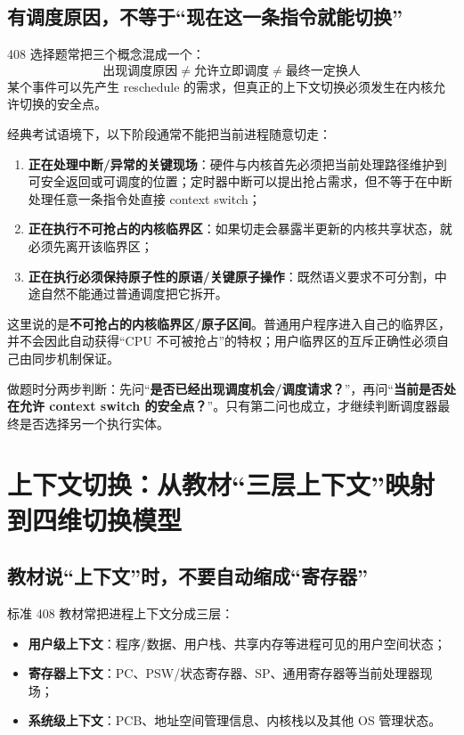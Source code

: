 \documentclass[11pt,a4paper]{ctexart}
\newcommand{\kw}[1]{\textbf{#1}}
\begin{document}
\subsection{有调度原因，不等于“现在这一条指令就能切换”}

408 选择题常把三个概念混成一个：
\[
\boxed{\text{出现调度原因}\neq\text{允许立即调度}\neq\text{最终一定换人}}
\]
某个事件可以先产生 reschedule 的需求，但真正的上下文切换必须发生在内核允许切换的安全点。

经典考试语境下，以下阶段通常不能把当前进程随意切走：
\begin{enumerate}
\item \kw{正在处理中断/异常的关键现场}：硬件与内核首先必须把当前处理路径维护到可安全返回或可调度的位置；定时器中断可以提出抢占需求，但不等于在中断处理任意一条指令处直接 context switch；
\item \kw{正在执行不可抢占的内核临界区}：如果切走会暴露半更新的内核共享状态，就必须先离开该临界区；
\item \kw{正在执行必须保持原子性的原语/关键原子操作}：既然语义要求不可分割，中途自然不能通过普通调度把它拆开。
\end{enumerate}

\begin{warn}
这里说的是\kw{不可抢占的内核临界区/原子区间}。普通用户程序进入自己的临界区，并不会因此自动获得“CPU 不可被抢占”的特权；用户临界区的互斥正确性必须自己由同步机制保证。
\end{warn}

\begin{corebox}[调度安全点模型]
做题时分两步判断：先问“\kw{是否已经出现调度机会/调度请求？}”，再问“\kw{当前是否处在允许 context switch 的安全点？}”。只有第二问也成立，才继续判断调度器最终是否选择另一个执行实体。
\end{corebox}

\section{上下文切换：从教材“三层上下文”映射到四维切换模型}

\subsection{教材说“上下文”时，不要自动缩成“寄存器”}

标准 408 教材常把进程上下文分成三层：
\begin{itemize}
\item \kw{用户级上下文}：程序/数据、用户栈、共享内存等进程可见的用户空间状态；
\item \kw{寄存器上下文}：PC、PSW/状态寄存器、SP、通用寄存器等当前处理器现场；
\item \kw{系统级上下文}：PCB、地址空间管理信息、内核栈以及其他 OS 管理状态。
\end{itemize}
\end{document}
